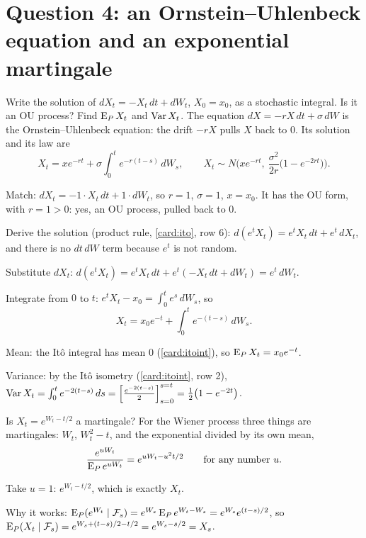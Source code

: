 \section{Question 4: an Ornstein--Uhlenbeck equation and an exponential martingale}

\begin{problem}[Q4(a)]
Write the solution of $dX_t=-X_t\,dt+dW_t$, $X_0=x_0$, as a stochastic integral. Is it an OU process? Find $\operatorname{E}_PX_t$ and $\operatorname{Var} X_t$.
\cardsays The equation $dX=-rX\,dt+\sigma\,dW$ is the Ornstein--Uhlenbeck equation: the drift $-rX$ pulls $X$ back to $0$. Its solution and its law are
\[
X_t=xe^{-rt}+\sigma\int_0^te^{-r(t-s)}\,dW_s,\qquad X_t\sim N\Big(xe^{-rt},\ \frac{\sigma^2}{2r}\big(1-e^{-2rt}\big)\Big).
\]
\working
\begin{steps}
\item Match: $dX_t=-1\cdot X_t\,dt+1\cdot dW_t$, so $r=1$, $\sigma=1$, $x=x_0$. It has the OU form, with $r=1>0$: yes, an OU process, pulled back to $0$.
\item Derive the solution (product rule, \cref{card:ito}, row 6): $d(e^tX_t)=e^tX_t\,dt+e^t\,dX_t$, and there is no $dt\,dW$ term because $e^t$ is not random.
\item Substitute $dX_t$: $d(e^tX_t)=e^tX_t\,dt+e^t(-X_t\,dt+dW_t)=e^t\,dW_t$.
\item Integrate from $0$ to $t$: $e^tX_t-x_0=\int_0^te^s\,dW_s$, so
\[
X_t=x_0e^{-t}+\int_0^te^{-(t-s)}\,dW_s.
\]
\item Mean: the Itô integral has mean $0$ (\cref{card:itoint}), so $\operatorname{E}_PX_t=x_0e^{-t}$.
\item Variance: by the Itô isometry (\cref{card:itoint}, row 2), $\operatorname{Var} X_t=\int_0^te^{-2(t-s)}\,ds=\Big[\frac{e^{-2(t-s)}}2\Big]_{s=0}^{s=t}=\frac12\big(1-e^{-2t}\big)$.
\end{steps}
\end{problem}

\begin{problem}[Q4(b)(i)]
Is $X_t=e^{W_t-t/2}$ a martingale?
\cardsays For the Wiener process three things are martingales: $W_t$, $W_t^2-t$, and the exponential divided by its own mean,
\[
\frac{e^{uW_t}}{\operatorname{E}_Pe^{uW_t}}=e^{uW_t-u^2t/2}\qquad\text{for any number }u.
\]
\working
\begin{steps}
\item Take $u=1$: $e^{W_t-t/2}$, which is exactly $X_t$.
\item Why it works: $\operatorname{E}_P(e^{W_t}\mid\mathcal F_s)=e^{W_s}\operatorname{E}_Pe^{W_t-W_s}=e^{W_s}e^{(t-s)/2}$, so $\operatorname{E}_P(X_t\mid\mathcal F_s)=e^{W_s+(t-s)/2-t/2}=e^{W_s-s/2}=X_s$.
\end{steps}
\end{problem}

